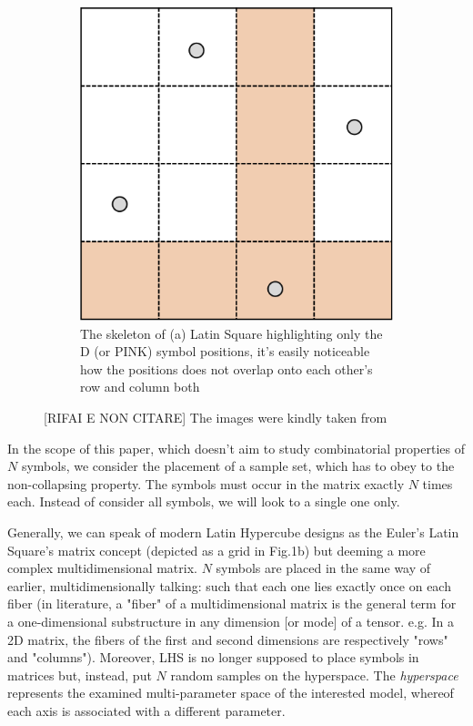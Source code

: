 \documentclass[12pt]{extarticle}
\newcommand{\midcaption}[1]{
    \captionsetup{justification=centering}
    \caption{#1}
}
\begin{document}
\begin{figure}[h]
\begin{subfigure}[b]{0.45\textwidth}
{        	\includegraphics[width=\textwidth]{src/imgs/latin_square_skeleton.png}
        	\caption{The skeleton of (a) Latin Square highlighting only the D (or PINK) symbol positions, it's easily noticeable how the positions does not overlap onto each other's row and column both}
        	\label{fig:latin_square_b}
        }
    \end{subfigure}
    
    \midcaption{[RIFAI E NON CITARE] The images were kindly taken from \fancycite{sheikholeslami2017}}
    \label{fig:latin_square}
\end{figure}

In the scope of this paper, which doesn't aim to study combinatorial properties of $N$ symbols, we consider the placement of a sample set, which has to obey to the non-collapsing property. The symbols must occur in the matrix exactly $N$ times each. Instead of consider all symbols, we will look to a single one only. 

Generally, we can speak of modern Latin Hypercube designs as the Euler's Latin Square's matrix concept (depicted as a grid in Fig.1b) but deeming a more complex multidimensional matrix. $N$ symbols are placed in the same way of earlier, multidimensionally talking: such that each one lies exactly once on each fiber (in literature, a "fiber" of a multidimensional matrix is the general term for a one-dimensional substructure in any dimension [or mode] of a tensor. e.g. In a 2D matrix, the fibers of the first and second dimensions are respectively "rows" and "columns").
Moreover, LHS is no longer supposed to place symbols in matrices but, instead, put $N$ random samples on the hyperspace. The \textit{hyperspace} represents the examined multi-parameter space of the interested model, whereof each axis is associated with a different parameter.
\end{document}
